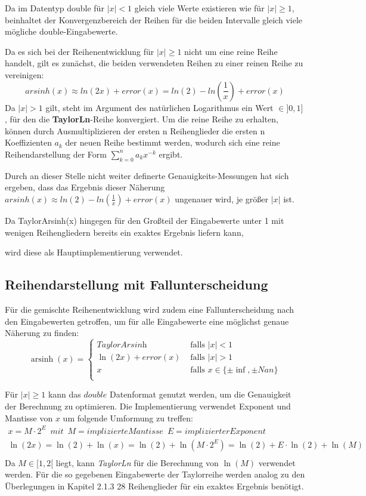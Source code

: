 \documentclass[course=erap] {aspdoc}
\begin{document}
    Da im Datentyp double für $|x|<1$ gleich viele Werte existieren wie für $|x|\geq1$, beinhaltet der Konvergenzbereich der Reihen für die beiden Intervalle gleich viele mögliche double-Eingabewerte.

    Da es sich bei der Reihenentwicklung für $|x|\geq1$ nicht um eine reine Reihe handelt, gilt es zunächst, die beiden verwendeten Reihen zu einer reinen Reihe zu vereinigen:
    \[
        arsinh(x)\approx ln(2x) + error(x) = ln(2) - ln(\frac{1}{x}) + error(x)
    \]
    Da $|x|>1$ gilt, steht im Argument des natürlichen Logarithmus ein Wert $\in ]0, 1]$, für den die \textbf{TaylorLn}-Reihe konvergiert.
    Um die reine Reihe zu erhalten, können durch Ausmultiplizieren der ersten n Reihenglieder die ersten n Koeffizienten $a_k$ der neuen Reihe bestimmt werden, wodurch sich eine reine Reihendarstellung der Form $\sum_{k=0}^{n} a_k x^{-k}$ ergibt.

    Durch an dieser Stelle nicht weiter definerte Genauigkeits-Messungen hat sich ergeben, dass das Ergebnis dieser Näherung $ arsinh(x)\approx ln(2) - ln(\frac{1}{x}) + error(x)$ ungenauer wird, je größer $|x|$ ist.

    Da TaylorArsinh(x) hingegen für den Großteil der Eingabewerte unter 1 mit wenigen Reihengliedern bereits ein exaktes Ergebnis liefern kann,

    wird diese als Hauptimplementierung verwendet.


    \subsection{Reihendarstellung mit Fallunterscheidung}\label{subsec:reihendarstellung-mit-fallunterscheidung}

    Für die gemischte Reihenentwicklung wird zudem eine Fallunterscheidung nach den Eingabewerten getroffen, um für alle Eingabewerte eine möglichst genaue Näherung zu finden:
    \[ \operatorname{arsinh}(x) =
    \begin{cases}
        \textit{TaylorArsinh}     & \text{ falls } |x| < 1 \\
        \ln(2x) + error(x)  & \text{ falls } |x| >1 \\
        x     & \text{ falls } x \in \{\pm\inf, \pm Nan\}\\
    \end{cases}\]

    Für $|x|\geq1$ kann das $double$ Datenformat genutzt werden, um die Genauigkeit der Berechnung zu optimieren.
    Die Implementierung verwendet Exponent und Mantisse von $x$ um folgende Umformung zu treffen:
    \begin{gather*}
        x = M\cdot2^E \,\,\, mit \,\,\, M = implizierte Mantisse \,\,\, E = implizierter Exponent\\
        \ln(2x) = \ln(2) + \ln(x) = \ln(2) + \ln(M\cdot2^E) = \ln(2) + E\cdot\ln(2) + \ln(M)\\
    \end{gather*}
    Da $M\in[1, 2[$ liegt, kann \textit{TaylorLn} für die Berechnung von $\ln(M)$ verwendet werden.
    Für die so gegebenen Eingabewerte der Taylorreihe werden analog zu den Überlegungen in Kapitel 2.1.3 28 Reihenglieder für ein exaktes Ergebnis benötigt.
\end{document}
